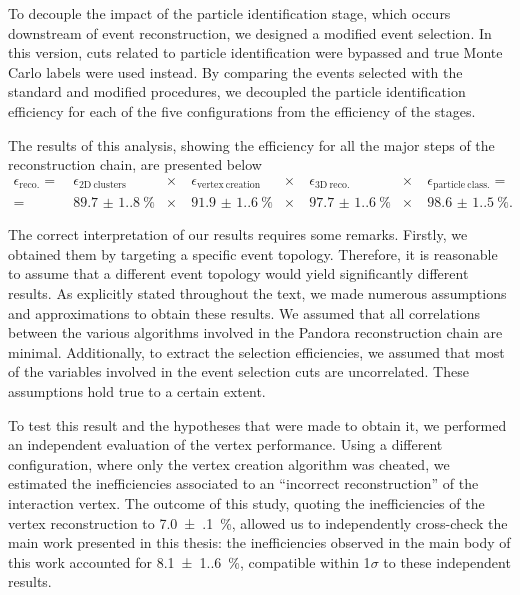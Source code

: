 To decouple the impact of the particle identification stage, which occurs downstream of event reconstruction, we designed a modified event selection. In this version, cuts related to particle identification were bypassed and true Monte Carlo labels were used instead. By comparing the events selected with the standard and modified procedures, we decoupled the particle identification efficiency for each of the five configurations from the efficiency of the stages.

The results of this analysis, showing the efficiency for all the major steps of the reconstruction chain, are presented below \begin{equation*}
    \begin{aligned}
        \epsilon_\mathrm{reco.} =&\
        \epsilon_\mathrm{2D\ clusters} &\times&\ 
        \epsilon_\mathrm{vertex\ creation} &\times&\ 
        \epsilon_\mathrm{3D\ reco.} &\times&\ 
        \epsilon_\mathrm{particle\ class.} =\\  
        =&\ \SI{89.7(1.8)}{\percent} &\times&\ 
        \SI{91.9(1.6)}{\percent} &\times&\ 
        \SI{97.7(1.6)}{\percent} &\times&\ 
        \SI{98.6(1.5)}{\percent}.
    \end{aligned}
\end{equation*}

The correct interpretation of our results requires some remarks. Firstly, we obtained them by targeting a specific event topology. Therefore, it is reasonable to assume that a different event topology would yield significantly different results. As explicitly stated throughout the text, we made numerous assumptions and approximations to obtain these results. We assumed that all correlations between the various algorithms involved in the Pandora reconstruction chain are minimal. Additionally, to extract the selection efficiencies, we assumed that most of the variables involved in the event selection cuts are uncorrelated. These assumptions hold true to a certain extent.

To test this result and the hypotheses that were made to obtain it, we performed an independent evaluation of the vertex performance. Using a different configuration, where only the vertex creation algorithm was cheated, we estimated the inefficiencies associated to an ``incorrect reconstruction'' of the interaction vertex. The outcome of this study, quoting the inefficiencies of the vertex reconstruction to \SI{7.0(1)}{\percent}, allowed us to independently cross-check the main work presented in this thesis: the inefficiencies observed in the main body of this work accounted for \SI{8.1(1.6)}{\percent}, compatible within 1$\sigma$ to these independent results. 

